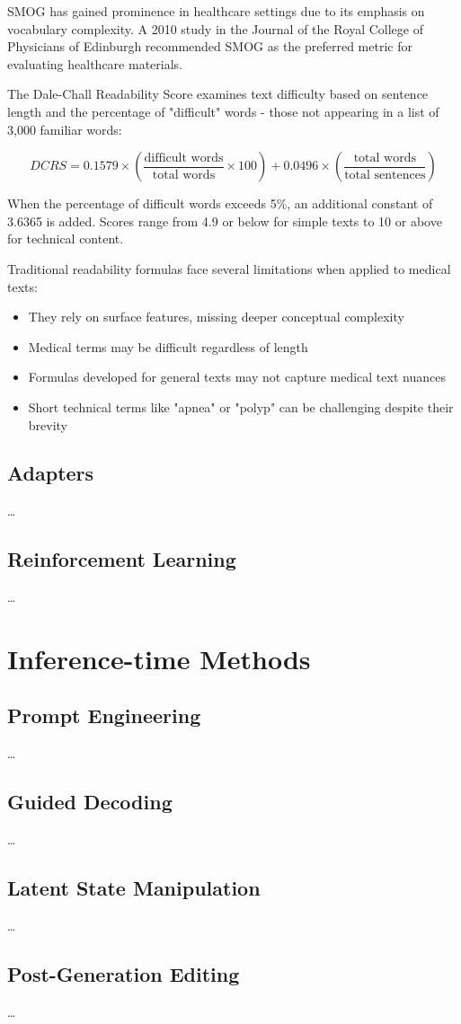SMOG has gained prominence in healthcare settings due to its emphasis on vocabulary complexity. A 2010 study in the Journal of the Royal College of Physicians of Edinburgh recommended SMOG as the preferred metric for evaluating healthcare materials.

The Dale-Chall Readability Score examines text difficulty based on sentence length and the percentage of "difficult" words - those not appearing in a list of 3,000 familiar words:

\begin{equation}
    DCRS = 0.1579 \times \left(\frac{\text{difficult words}}{\text{total words}} \times 100\right) + 0.0496 \times \left(\frac{\text{total words}}{\text{total sentences}}\right)
\end{equation}

When the percentage of difficult words exceeds 5\%, an additional constant of 3.6365 is added. Scores range from 4.9 or below for simple texts to 10 or above for technical content.

Traditional readability formulas face several limitations when applied to medical texts:

\begin{itemize}
    \item They rely on surface features, missing deeper conceptual complexity
    \item Medical terms may be difficult regardless of length
    \item Formulas developed for general texts may not capture medical text nuances
    \item Short technical terms like "apnea" or "polyp" can be challenging despite their brevity
\end{itemize}



\subsection{Adapters}
\dots

\subsection{Reinforcement Learning}
\dots

\section{Inference-time Methods}
\label{c2:s:inference-time}

\subsection{Prompt Engineering}
\dots

\subsection{Guided Decoding}
\dots

\subsection{Latent State Manipulation}
\dots

\subsection{Post-Generation Editing}
\dots


